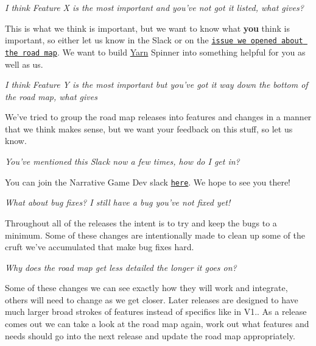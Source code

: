 {\itshape I think Feature X is the most important and you've not got it listed, what gives?}

This is what we think is important, but we want to know what {\bfseries you} think is important, so either let us know in the Slack or on the \href{https://github.com/YarnSpinnerTool/YarnSpinner/issues/183}{\tt issue we opened about the road map}. We want to build \hyperlink{a00050}{Yarn} Spinner into something helpful for you as well as us.

{\itshape I think Feature Y is the most important but you've got it way down the bottom of the road map, what gives}

We've tried to group the road map releases into features and changes in a manner that we think makes sense, but we want your feedback on this stuff, so let us know.

{\itshape You've mentioned this Slack now a few times, how do I get in?}

You can join the Narrative Game Dev slack \href{http://lab.to/narrativegamedev}{\tt here}. We hope to see you there!

{\itshape What about bug fixes? I still have a bug you've not fixed yet!}

Throughout all of the releases the intent is to try and keep the bugs to a minimum. Some of these changes are intentionally made to clean up some of the cruft we've accumulated that make bug fixes hard.

{\itshape Why does the road map get less detailed the longer it goes on?}

Some of these changes we can see exactly how they will work and integrate, others will need to change as we get closer. Later releases are designed to have much larger broad strokes of features instead of specifics like in V1.. As a release comes out we can take a look at the road map again, work out what features and needs should go into the next release and update the road map appropriately. 
